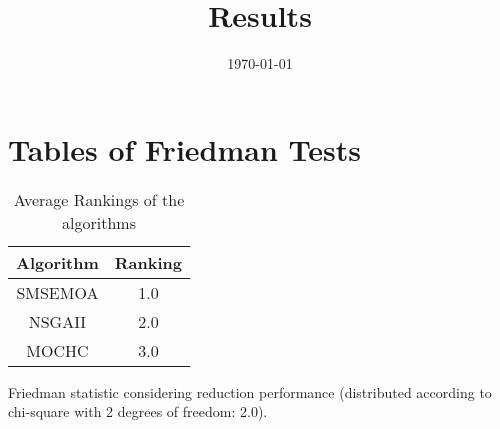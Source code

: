 \documentclass{article}
\title{Results}
\author{}
\date{\today}
\begin{document}
\oddsidemargin 0in \topmargin 0in\maketitle
\section{Tables of Friedman Tests}
\begin{table}[!htp]
\centering
\caption{Average Rankings of the algorithms
}\begin{tabular}{c|c}
Algorithm&Ranking\\
\hline
SMSEMOA&1.0\\
NSGAII&2.0\\
MOCHC&3.0\\
\end{tabular}
\end{table}


Friedman statistic considering reduction performance (distributed according to chi-square with 2 degrees of freedom: 2.0).
\end{document}
